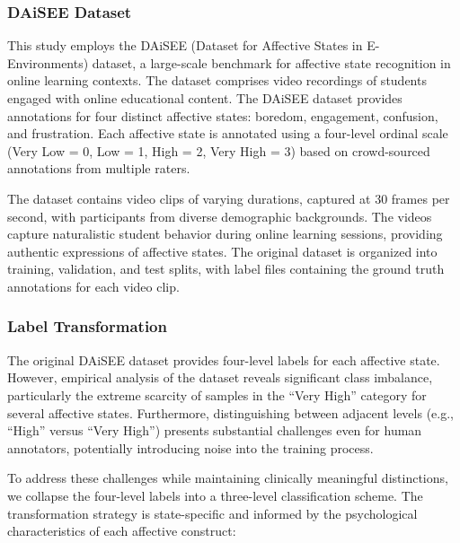 \documentclass[11pt,a4paper]{article}
\begin{document}
\subsubsection{DAiSEE Dataset}

This study employs the DAiSEE (Dataset for Affective States in E-Environments) dataset, a large-scale benchmark for affective state recognition in online learning contexts\cite{gupta2016daisee}. The dataset comprises video recordings of students engaged with online educational content. The DAiSEE dataset provides annotations for four distinct affective states: boredom, engagement, confusion, and frustration. Each affective state is annotated using a four-level ordinal scale (Very Low = 0, Low = 1, High = 2, Very High = 3) based on crowd-sourced annotations from multiple raters.

The dataset contains video clips of varying durations, captured at 30 frames per second, with participants from diverse demographic backgrounds. The videos capture naturalistic student behavior during online learning sessions, providing authentic expressions of affective states. The original dataset is organized into training, validation, and test splits, with label files containing the ground truth annotations for each video clip.

\subsubsection{Label Transformation}

The original DAiSEE dataset provides four-level labels for each affective state. However, empirical analysis of the dataset reveals significant class imbalance, particularly the extreme scarcity of samples in the ``Very High'' category for several affective states. Furthermore, distinguishing between adjacent levels (e.g., ``High'' versus ``Very High'') presents substantial challenges even for human annotators, potentially introducing noise into the training process.

To address these challenges while maintaining clinically meaningful distinctions, we collapse the four-level labels into a three-level classification scheme. The transformation strategy is state-specific and informed by the psychological characteristics of each affective construct:
\end{document}
